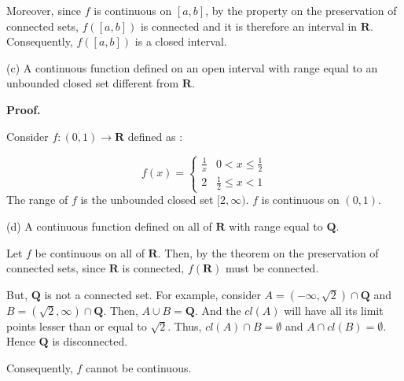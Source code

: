 \documentclass[10pt]{article}
\begin{document}
Moreover, since $\displaystyle f$ is continuous on $\displaystyle [ a,b]$, by the property on the preservation of connected sets, $\displaystyle f([ a,b])$ is connected and it is therefore an interval in $\displaystyle \mathbf{R}$. Consequently, $\displaystyle f([ a,b])$ is a closed interval.



(c) A continuous function defined on an open interval with range equal to an unbounded closed set different from $\displaystyle \mathbf{R}$.



\textbf{Proof.}



Consider $\displaystyle f:( 0,1)\rightarrow \mathbf{R}$ defined as :


\begin{equation*}
f( x) =\begin{cases}
\frac{1}{x} & 0< x\leq \frac{1}{2}\\
2 & \frac{1}{2} \leq x< 1
\end{cases}
\end{equation*}
The range of $\displaystyle f$ is the unbounded closed set $\displaystyle [ 2,\infty )$. $\displaystyle f$ is continuous on $\displaystyle ( 0,1)$. 



(d) A continuous function defined on all of $\displaystyle \mathbf{R}$ with range equal to $\displaystyle \mathbf{Q}$. 



Let $\displaystyle f$ be continuous on all of $\displaystyle \mathbf{R}$. Then, by the theorem on the preservation of connected sets, since $\displaystyle \mathbf{R}$ is connected, $\displaystyle f(\mathbf{R})$ must be connected. 



But, $\displaystyle \mathbf{Q}$ is not a connected set. For example, consider $\displaystyle A=\left( -\infty ,\sqrt{2}\right) \cap \mathbf{Q}$ and $\displaystyle B=\left(\sqrt{2} ,\infty \right) \cap \mathbf{Q}$. Then, $\displaystyle A\cup B=\mathbf{Q}$. And the $\displaystyle cl( A)$ will have all its limit points lesser than or equal to $\displaystyle \sqrt{2}$. Thus, $\displaystyle cl( A) \cap B=\emptyset $ and $\displaystyle A\cap cl( B) =\emptyset $. Hence $\displaystyle \mathbf{Q}$ is disconnected.



Consequently, $\displaystyle f$ cannot be continuous. 
\end{document}
